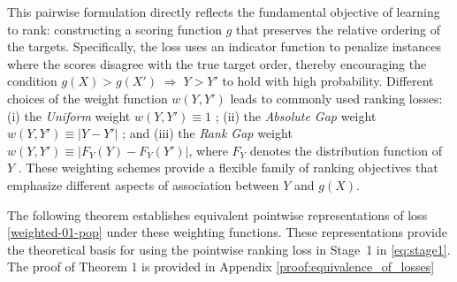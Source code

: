 \documentclass[11pt]{article}
\theoremstyle{plain}
\theoremstyle{plain}
\theoremstyle{plain}
\theoremstyle{plain}
\theoremstyle{plain}
\theoremstyle{plain}
\theoremstyle{plain}
\begin{document}
This pairwise formulation directly reflects the fundamental objective of learning to rank: constructing a scoring function $g$ that preserves the relative ordering of the targets. 
Specifically, the loss uses an indicator function to penalize instances where the scores disagree with the true target order, thereby encouraging the condition  $g(X) > g(X') \;\Longrightarrow\; Y > Y'$ to hold with high probability.  Different choices of the weight function $w(Y,Y')$ leads to commonly used ranking losses: (i) the \emph{Uniform} weight $w(Y,Y') \equiv 1$ \citep{clemenccon2008ranking, burges2005learning};
(ii) the \emph{Absolute Gap} weight $w(Y,Y') \equiv |Y-Y'|$ \citep{agarwal2005stability, wang2018lambdaloss};
and (iii) the \emph{Rank Gap} weight $w(Y,Y') \equiv |F_Y(Y)-F_Y(Y')|$, where $F_Y$ denotes the distribution function of $Y$ \citep{menon2016bipartite}.
These weighting schemes provide a flexible family of ranking objectives that emphasize different aspects of association between $Y$ and $g(X)$.

The following theorem establishes equivalent pointwise representations of loss \eqref{weighted-01-pop} under these weighting functions. These representations provide the theoretical basis for using the pointwise ranking loss in Stage~1 in \eqref{eq:stage1}. The proof of Theorem 1 is provided in Appendix \ref{proof:equivalence_of_losses}
\end{document}

